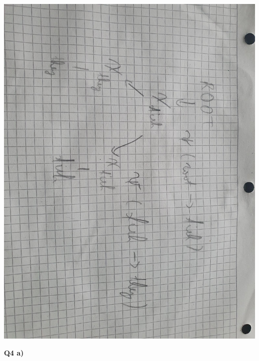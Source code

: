 \documentclass{article}
\begin{document}
	\includegraphics[angle=90,origin=c,width=\textwidth]{figures/relational_parse}
	

	
\newpage
\textbf{Q4 a)}
\end{document}
